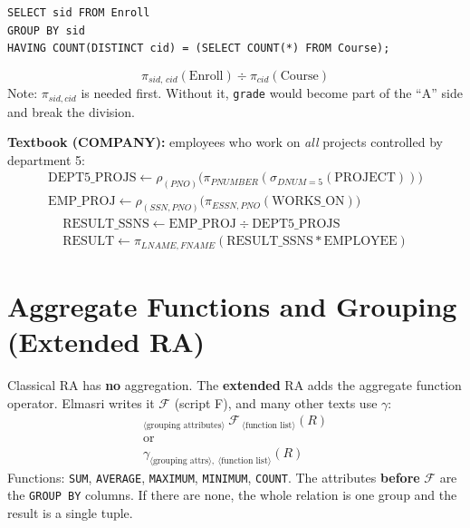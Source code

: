 \documentclass[10pt,a4paper]{article}
\newcommand{\R}[1]{\mathrm{#1}}          %
\newcommand{\agg}{\mathcal{F}}            %
\begin{document}
\begin{exbox}
\begin{verbatim}
SELECT sid FROM Enroll
GROUP BY sid
HAVING COUNT(DISTINCT cid) = (SELECT COUNT(*) FROM Course);
\end{verbatim}
\[ \pi_{sid,\,cid}(\R{Enroll}) \div \pi_{cid}(\R{Course}) \]
Note: $\pi_{sid,cid}$ is needed first. Without it, \texttt{grade} would become part of the ``A'' side and break the division.

\textbf{Textbook (COMPANY):} employees who work on \emph{all} projects controlled by department 5:
\begin{gather*}
\R{DEPT5\_PROJS} \leftarrow \rho_{(PNO)}\big(\pi_{PNUMBER}(\sigma_{DNUM=5}(\R{PROJECT}))\big) \\
\R{EMP\_PROJ} \leftarrow \rho_{(SSN,PNO)}\big(\pi_{ESSN,PNO}(\R{WORKS\_ON})\big)
\end{gather*}
\begin{gather*}
\R{RESULT\_SSNS} \leftarrow \R{EMP\_PROJ} \div \R{DEPT5\_PROJS} \\
\R{RESULT} \leftarrow \pi_{LNAME,FNAME}(\R{RESULT\_SSNS} * \R{EMPLOYEE})
\end{gather*}
\end{exbox}

\section{Aggregate Functions and Grouping (Extended RA)}

Classical RA has \textbf{no} aggregation. The \textbf{extended} RA adds the aggregate function operator. Elmasri writes it $\agg$ (script F), and many other texts use $\gamma$:
\begin{gather*}
{}_{\langle\text{grouping attributes}\rangle}\ \agg_{\ \langle\text{function list}\rangle}(R) \\
\text{or} \\
\gamma_{\langle\text{grouping attrs}\rangle,\ \langle\text{function list}\rangle}(R)
\end{gather*}
Functions: \texttt{SUM}, \texttt{AVERAGE}, \texttt{MAXIMUM}, \texttt{MINIMUM}, \texttt{COUNT}. The attributes \textbf{before} $\agg$ are the \texttt{GROUP BY} columns. If there are none, the whole relation is one group and the result is a single tuple.
\end{document}

